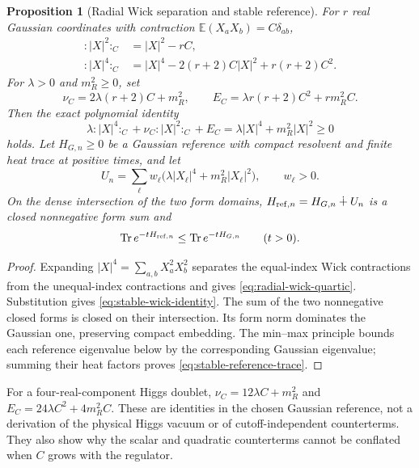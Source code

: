 \documentclass[11pt,a4paper,oneside]{book}
\theoremstyle{plain}
\newtheorem{proposition}[theorem]{Proposition}
\theoremstyle{definition}
\theoremstyle{remark}
\newcommand{\E}{\mathbb E}
\newcommand{\Tr}{\operatorname{Tr}}
\newcommand{\src}[2]{\cite{#1}}
\begin{document}
\begin{proposition}[Radial Wick separation and stable reference]
\label{prop:stable-wick-reference}
For $r$ real Gaussian coordinates with contraction
$\E(X_aX_b)=C\delta_{ab}$,
\begin{align}
 :|X|^2:_C&=|X|^2-rC,\\
 :|X|^4:_C&=|X|^4-2(r+2)C|X|^2+r(r+2)C^2.
 \label{eq:radial-wick-quartic}
\end{align}
For $\lambda>0$ and $m_R^2\ge0$, set
\begin{equation}
 \nu_C=2\lambda(r+2)C+m_R^2,\qquad
 E_C=\lambda r(r+2)C^2+rm_R^2C.
 \label{eq:stable-wick-counterterms}
\end{equation}
Then the exact polynomial identity
\begin{equation}
 \lambda:|X|^4:_C+\nu_C:|X|^2:_C+E_C
 =\lambda|X|^4+m_R^2|X|^2\ge0
 \label{eq:stable-wick-identity}
\end{equation}
holds.  Let $H_{G,n}\ge0$ be a Gaussian reference with compact resolvent
and finite heat trace at positive times, and let
\[
 U_n=\sum_\ell w_\ell
       \bigl(\lambda|X_\ell|^4+m_R^2|X_\ell|^2\bigr),\qquad w_\ell>0.
\]
On the dense intersection of the two form domains,
$H_{{\rm ref},n}=H_{G,n}\dotplus U_n$ is a closed nonnegative form sum and
\begin{equation}
 \Tr e^{-tH_{{\rm ref},n}}\le\Tr e^{-tH_{G,n}}
 \qquad(t>0).
 \label{eq:stable-reference-trace}
\end{equation}
\end{proposition}
\begin{proof}
Expanding $|X|^4=\sum_{a,b}X_a^2X_b^2$ separates the equal-index Wick
contractions from the unequal-index contractions and gives
\eqref{eq:radial-wick-quartic}.  Substitution gives
\eqref{eq:stable-wick-identity}.  The sum of the two nonnegative closed
forms is closed on their intersection.  Its form norm dominates the
Gaussian one, preserving compact embedding.  The min--max principle
bounds each reference eigenvalue below by the corresponding Gaussian
eigenvalue; summing their heat factors proves
\eqref{eq:stable-reference-trace}.
\end{proof}
\src{R15}{lem:v15v93-wick,thm:v15v93-stable-wick,prop:v15v93-reference}

For a four-real-component Higgs doublet,
$\nu_C=12\lambda C+m_R^2$ and $E_C=24\lambda C^2+4m_R^2C$.
These are identities in the chosen Gaussian reference, not a derivation
of the physical Higgs vacuum or of cutoff-independent counterterms.
They also show why the scalar and quadratic counterterms cannot be
conflated when $C$ grows with the regulator.
\end{document}
